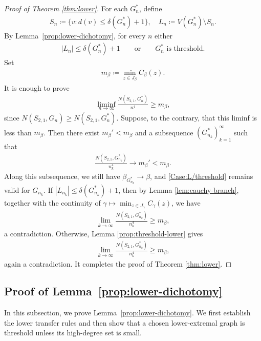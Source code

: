\documentclass[10pt,a4paper]{article}
\begin{document}
\begin{proof}[Proof of Theorem \ref{thm:lower}]
For each $G_n^*$, define
\begin{align*}
    S_n\coloneqq \{v:d(v)\le \delta(G_n^*)+1\},\quad L_n\coloneqq V(G_n^*)\setminus S_n.
\end{align*}  
By Lemma~\ref{prop:lower-dichotomy},  for every $n$ either
\begin{align}\label{Case:L/threshold}
   |L_n|\le\delta(G_n^*)+1
  \qquad\text{or}\qquad
  G_n^*\text{ is threshold}.
\end{align}
Set
\begin{align*}
  m_\beta\coloneqq\min_{z\in J_\beta}C_\beta(z).
\end{align*}
It is enough to prove
\begin{align*}
  \liminf_{n\to\infty}\frac{N(S_{2,1},G_n^*)}{n^4}\ge m_\beta,
\end{align*}
since $N(S_{2,1},G_n)\ge N(S_{2,1},G_n^*)$.  Suppose, to the contrary, that this liminf is less than $m_\beta$.  Then there exist $m_\beta'<m_\beta$ and a subsequence $(G_{n_k}^*)_{k=1}^\infty$ such that
\begin{align*}
  \frac{N(S_{2,1},G_{n_k}^*)}{n_k^4}\to m_\beta'<m_\beta.
\end{align*}
Along this subsequence, we still have $\beta_{G_{n_k}^*}\to\beta$, and  \eqref{Case:L/threshold} remains valid for $G_{n_k}$.  If $|L_{n_k}|\le\delta(G_{n_k}^*)+1$, then by Lemma \ref{lem:cauchy-branch}, together with the continuity of $\gamma\mapsto\min_{z\in J_\gamma}C_\gamma(z)$, we have 
\begin{align*}
  \lim_{k\to\infty}\frac{N(S_{2,1},G_{n_{k}}^*)}{n_{k}^4}\ge m_\beta,
\end{align*}
a contradiction. Otherwise,   Lemma \ref{prop:threshold-lower} gives 
\begin{align*}
    \lim_{k\to\infty}\frac{N(S_{2,1},G_{n_{k}}^*)}{n_{k}^4}\ge m_\beta,
\end{align*}
again a contradiction.  It completes the proof of  Theorem \ref{thm:lower}.
\end{proof}


\subsection{Proof of Lemma~\ref{prop:lower-dichotomy}}\label{subsec:prove-lemma4.1}

In this subsection, we prove Lemma~\ref{prop:lower-dichotomy}. We first establish the lower transfer rules 
and then show that a chosen lower-extremal graph is threshold unless its 
high-degree set is small.
\end{document}
